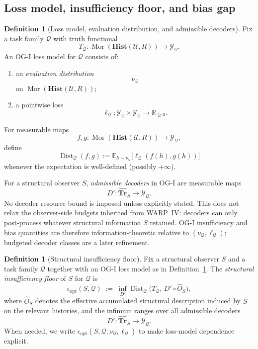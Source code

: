 \documentclass[11pt,twoside]{article}
\theoremstyle{definition}
\newtheorem{definition}[theorem]{Definition}
\newcommand{\Hist}{\mathbf{Hist}}
\newcommand{\Tr}{\mathbf{Tr}}
\DeclareMathOperator{\Dist}{Dist}
\DeclareMathOperator{\Mor}{Mor}
\begin{document}
\subsection{Loss model, insufficiency floor, and bias gap}
\label{subsec:loss-insuff-bias}

\begin{definition}[Loss model, evaluation distribution, and admissible decoders]
\label{def:loss-model-and-decoders}
Fix a task family \(\mathcal{Q}\) with truth functional
\[
  T_{\mathcal{Q}} : \Mor(\Hist(\mathcal{U},R)) \to \mathcal{Y}_{\mathcal{Q}}.
\]
An OG-I loss model for \(\mathcal{Q}\) consists of:
\begin{enumerate}[leftmargin=*]
  \item an \emph{evaluation distribution}
        \[
          \nu_{\mathcal{Q}}
        \]
        on \(\Mor(\Hist(\mathcal{U},R))\);
  \item a pointwise loss
        \[
          \ell_{\mathcal{Q}} : \mathcal{Y}_{\mathcal{Q}} \times \mathcal{Y}_{\mathcal{Q}}
          \to
          \mathbb{R}_{\ge 0}.
        \]
\end{enumerate}
For measurable maps
\[
  f,g : \Mor(\Hist(\mathcal{U},R)) \to \mathcal{Y}_{\mathcal{Q}},
\]
define
\[
  \Dist_{\mathcal{Q}}(f,g)
  :=
  \mathbb{E}_{h\sim \nu_{\mathcal{Q}}}
  \bigl[
    \ell_{\mathcal{Q}}(f(h),g(h))
  \bigr]
\]
whenever the expectation is well-defined (possibly \(+\infty\)).

For a structural observer \(S\), \emph{admissible decoders} in OG-I are measurable maps
\[
  D' : \widehat{\Tr}_S \to \mathcal{Y}_{\mathcal{Q}}.
\]
No decoder resource bound is imposed unless explicitly stated. This does not relax the observer-side budgets inherited from WARP~IV: decoders can only post-process whatever structural information \(S\) retained. OG-I insufficiency and bias quantities are therefore information-theoretic relative to \((\nu_{\mathcal{Q}},\ell_{\mathcal{Q}})\); budgeted decoder classes are a later refinement.
\end{definition}

\begin{definition}[Structural insufficiency floor]
\label{def:insufficiency-floor}
Fix a structural observer \(S\) and a task family \(\mathcal{Q}\) together with an OG-I loss model as in Definition~\ref{def:loss-model-and-decoders}. The \emph{structural insufficiency floor} of \(S\) for \(\mathcal{Q}\) is
\[
  \epsilon_{\mathrm{opt}}(S,\mathcal{Q})
  \;:=\;
  \inf_{D'} \Dist_{\mathcal{Q}}\!\bigl(T_{\mathcal{Q}},\, D' \circ \widehat{O}_S\bigr),
\]
where \(\widehat{O}_S\) denotes the effective accumulated structural description induced by \(S\) on the relevant histories, and the infimum ranges over all admissible decoders
\[
  D' : \widehat{\Tr}_S \to \mathcal{Y}_{\mathcal{Q}}.
\]
\noindent When needed, we write \(\epsilon_{\mathrm{opt}}(S,\mathcal{Q};\nu_{\mathcal{Q}},\ell_{\mathcal{Q}})\) to make loss-model dependence explicit.
\end{definition}
\end{document}
